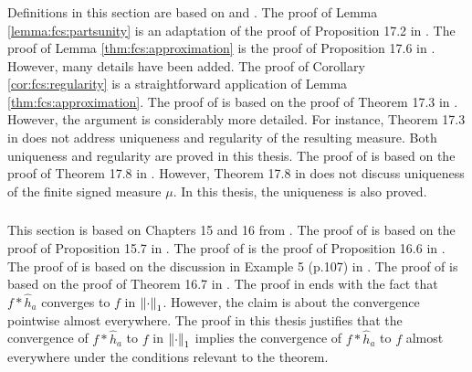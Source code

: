 \subsubsection{}
Definitions in this section are based on \cite{bass2011real} and \cite{munkres_2014_topology}. The proof of Lemma \ref{lemma:fcs:partsunity} is an adaptation of the proof of Proposition 17.2 in \cite{bass2011real}. The proof of Lemma \ref{thm:fcs:approximation} is the proof of Proposition 17.6 in \cite{bass2011real}. However, many details have been added. The proof of Corollary \ref{cor:fcs:regularity} is a straightforward application of Lemma \ref{thm:fcs:approximation}. The proof of  is based on the proof of Theorem 17.3 in \cite{bass2011real}. However, the argument is considerably more detailed. For instance, Theorem 17.3 in \cite{bass2011real} does not address uniqueness and regularity of the resulting measure. Both uniqueness and regularity are proved in this thesis. The proof of  is based on the proof of Theorem 17.8 in \cite{bass2011real}. However, Theorem 17.8 in \cite{bass2011real} does not discuss uniqueness of the finite signed measure $\mu$. In this thesis, the uniqueness is also proved.

\subsubsection{}
This section is based on Chapters 15 and 16 from \cite{bass2011real}.
The proof of  is based on the proof of Proposition 15.7 in \cite{bass2011real}.
The proof of  is the proof of Proposition 16.6 in \cite{bass2011real}.
The proof of  is based on the discussion in Example 5 (p.107) in \cite{jacod_2004_probability}.
The proof of  is based on the proof of Theorem 16.7 in \cite{bass2011real}. The proof in \cite{bass2011real} ends with the fact that $f \ast \widehat{h}_a$ converges to $f$ in $\left\lVert\cdot\right\rVert_1$. However, the claim is about the convergence pointwise almost everywhere. The proof in this thesis justifies that the convergence  of $f \ast \widehat{h}_a$ to $f$ in $\left\lVert\cdot\right\rVert_1$ implies the convergence of $f \ast \widehat{h}_a$ to $f$ almost everywhere under the conditions relevant to the theorem.